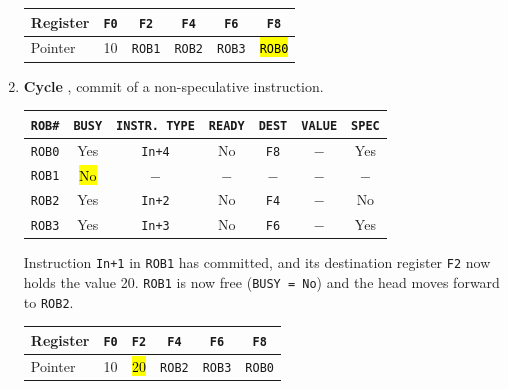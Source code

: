 \begin{examplebox}
\begin{enumerate}
        \begin{center}
            \begin{tabular}{@{} l | c c c c c @{}}
                \toprule
                Register    & \texttt{F0}   & \texttt{F2}   & \texttt{F4}           & \texttt{F6}           & \texttt{F8}           \\
                \midrule
                Pointer     & 10            & \texttt{ROB1} & \texttt{ROB2}         & \texttt{ROB3}         & \hl{\texttt{ROB0}}    \\
                \bottomrule
            \end{tabular}
        \end{center}


        \newpage


        \item \textbf{Cycle \theenumi}, commit of a non-speculative instruction.
        \begin{center}
            \begin{tabular}{@{} c | c | c | c | c | c | c @{}}
                \toprule
                \texttt{ROB\#} & \texttt{BUSY} & \texttt{INSTR. TYPE} & \texttt{READY} & \texttt{DEST} & \texttt{VALUE} & \texttt{SPEC} \\
                \midrule
                \texttt{ROB0} & Yes         & \texttt{In+4}         & No        & \texttt{F8}       & $-$       & Yes           \\ [.3em]
                \texttt{ROB1} & \hl{No}     & $-$                   & $-$       & $-$               & $-$       & $-$           \\ [.3em]
                \texttt{ROB2} & Yes         & \texttt{In+2}         & No        & \texttt{F4}       & $-$       & No            \\ [.3em]
                \texttt{ROB3} & Yes         & \texttt{In+3}         & No        & \texttt{F6}       & $-$       & Yes           \\
                \bottomrule
            \end{tabular}
        \end{center}
        Instruction \texttt{In+1} in \texttt{ROB1} has committed, and its destination register \texttt{F2} now holds the value 20. \texttt{ROB1} is now free (\texttt{BUSY = No}) and the head moves forward to \texttt{ROB2}.
        \begin{center}
            \begin{tabular}{@{} l | c c c c c @{}}
                \toprule
                Register    & \texttt{F0}   & \texttt{F2}   & \texttt{F4}           & \texttt{F6}           & \texttt{F8}           \\
                \midrule
                Pointer     & 10            & \hl{20}       & \texttt{ROB2}         & \texttt{ROB3}         & \texttt{ROB0}         \\
                \bottomrule
            \end{tabular}
        \end{center}



\end{enumerate}
\end{examplebox}
